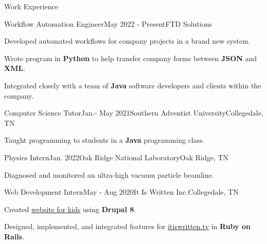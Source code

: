 \begin{rSection}{Work Experience}
	\begin{job}{Workflow Automation Engineer}{May 2022 - Present}{FTD Solutions}{}
		\item Developed automated workflows for company projects in a brand new system.
		\item Wrote program in {\bf Python} to help transfer company forms between {\bf JSON} and {\bf XML}.
		\item Integrated closely with a team of {\bf Java} software developers and clients within the company.
	\end{job}
	
	\begin{job}{Computer Science Tutor}{Jan.- May 2021}{Southern Adventist University}{Collegedale, TN}{}
	 \item Taught programming to students in a {\bf Java} programming class.
	\end{job}

	\begin{job}{Physics Intern}{Jan. 2022}{Oak Ridge National Laboratory}{Oak Ridge, TN}
	 \item Diagnosed and monitored an ultra-high vacuum particle beamline.
	\end{job}

	\begin{job}{Web Development Intern}{May - Aug 2020}{It Is Written Inc.}{Collegedale, TN}
		\item Created \href{https://buriedtreasure.fun/}{website for kids} using {\bf Drupal 8}.
		\item Designed, implemented, and integrated features for \href{https://itiswritten.tv}{itiswritten.tv} in {\bf Ruby on Rails}.
	\end{job}
\end{rSection}
